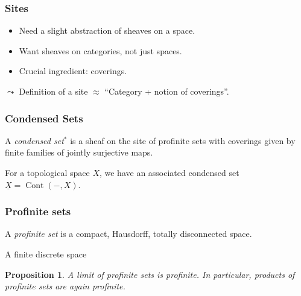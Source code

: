 \documentclass{beamer}
\newtheorem{proposition}{Proposition}
\DeclareMathOperator{\opp}{opp}
\DeclareMathOperator{\Cont}{Cont}
\begin{document}
\begin{frame}
    \frametitle{Sites}

    \begin{itemize}
        \item Need a slight abstraction of sheaves on a space.
        \item Want sheaves on categories, not just spaces.
        \item Crucial ingredient: coverings.
    \end{itemize}
    \medskip

    \pause
    $\leadsto$ Definition of a site $\approx $ ``Category + notion of coverings''.

\end{frame}

\begin{frame}
    \frametitle{Condensed Sets}

    \begin{definition}
        A \emph{condensed set}$^*$ is a sheaf on the site of profinite sets
        with coverings given by finite families of jointly surjective maps.
    \end{definition}
    \medskip
    \pause

    For a topological space $X$, we have an associated
    condensed set $\underline{X} = \Cont(-, X)$.

\end{frame}
\begin{frame}
    \frametitle{Profinite sets}


    \begin{definition}
        A \emph{profinite set} is a compact, Hausdorff, totally disconnected space.
    \end{definition}
    \begin{example}
        A finite discrete space
    \end{example}
    \pause

    \begin{proposition}
        A limit of profinite sets is profinite.
        In particular, products of profinite sets
        are again profinite.
    \end{proposition}

\end{frame}
\end{document}
